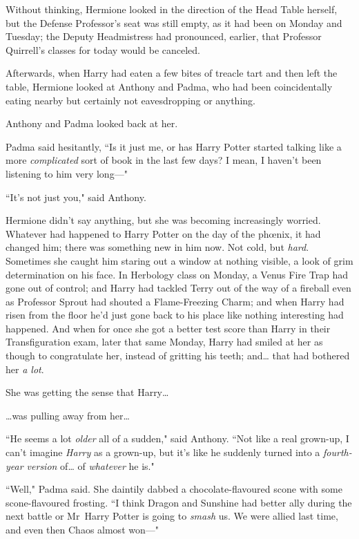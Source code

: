 Without thinking, Hermione looked in the direction of the Head Table herself, but the Defense Professor's seat was still empty, as it had been on Monday and Tuesday; the Deputy Headmistress had pronounced, earlier, that Professor Quirrell's classes for today would be canceled.

Afterwards, when Harry had eaten a few bites of treacle tart and then left the table, Hermione looked at Anthony and Padma, who had been coincidentally eating nearby but certainly not eavesdropping or anything.

Anthony and Padma looked back at her.

Padma said hesitantly, ``Is it just me, or has Harry Potter started talking like a more \emph{complicated} sort of book in the last few days? I mean, I haven't been listening to him very long—"

``It's not just you," said Anthony.

Hermione didn't say anything, but she was becoming increasingly worried. Whatever had happened to Harry Potter on the day of the phœnix, it had changed him; there was something new in him now. Not cold, but \emph{hard}. Sometimes she caught him staring out a window at nothing visible, a look of grim determination on his face. In Herbology class on Monday, a Venus Fire Trap had gone out of control; and Harry had tackled Terry out of the way of a fireball even as Professor Sprout had shouted a Flame-Freezing Charm; and when Harry had risen from the floor he'd just gone back to his place like nothing interesting had happened. And when for once she got a better test score than Harry in their Transfiguration exam, later that same Monday, Harry had smiled at her as though to congratulate her, instead of gritting his teeth; and{\ldots} that had bothered her \emph{a lot}.

She was getting the sense that Harry{\ldots}

{\ldots}was pulling away from her{\ldots}

``He seems a lot \emph{older} all of a sudden," said Anthony. ``Not like a real grown-up, I can't imagine \emph{Harry} as a grown-up, but it's like he suddenly turned into a \emph{fourth-year version} of{\ldots} of \emph{whatever} he is."

``Well," Padma said. She daintily dabbed a chocolate-flavoured scone with some scone-flavoured frosting. ``I think Dragon and Sunshine had better ally during the next battle or Mr~Harry Potter is going to \emph{smash} us. We were allied last time, and even then Chaos almost won—"

